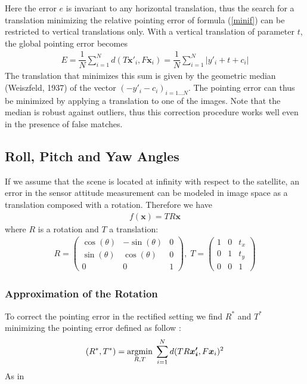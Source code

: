 \documentclass[paper=a4, fontsize=11pt, onecolumn, tikz, dvipsnames, svgnames, x11names]{article}
\begin{document}
Here the error $e$ is invariant to any horizontal translation, thus the search for a translation minimizing the relative pointing error of formula (\ref{minif}) can be restricted to vertical translations only. With a vertical translation of parameter $t$, the global pointing error becomes
\begin{align*}
E = \dfrac{1}{N} \sum\limits_{i=1}^{N} d(T\textbf{x}'_i, F\textbf{x}_i) = \dfrac{1}{N} \sum\limits_{i=1}^{N} | y'_i + t+ c_i|
\end{align*}
The translation that minimizes this sum is given by the geometric median (Weiszfeld, 1937) of the vector $(-y'_i - c_i )_{i=1...N}$.  The pointing error can thus be minimized by applying a translation to one of the images. Note that the median is robust against outliers, thus this correction procedure works well even in the presence of false matches.


\subsection{Roll, Pitch and Yaw Angles}
If we assume that the scene is located at infinity with respect to the satellite, an error in the sensor attitude measurement can be modeled in image space as a translation composed with a rotation. Therefore we have
\begin{align*}
f(\textbf{x}) = TR\textbf{x}
\end{align*}
where $R$ is a rotation and $T$ a translation:\\
\begin{align*}
R =
\begin{pmatrix}
\cos(\theta) & -\sin(\theta) & 0 \\
\sin(\theta) & \cos(\theta) & 0 \\
0 & 0 & 1
\end{pmatrix}, \;
T =
\begin{pmatrix}
1 & 0 & t_x \\
0 & 1 & t_y \\
0 & 0 & 1
\end{pmatrix}
\end{align*}

\subsubsection{Approximation of the Rotation}

To correct the pointing error in the rectified setting we find $R^*$ and $T^*$ minimizing the pointing error defined as follow :
\begin{align}
    (R^*, T^*) = \underset{R,T}{\operatorname{argmin}}\; \sum_{i=1}^N d(TR\bm{x_i'}, F\bm{x}_i)^2
\end{align}
As in~\cite{carlo_2014_automatic}
\end{document}
